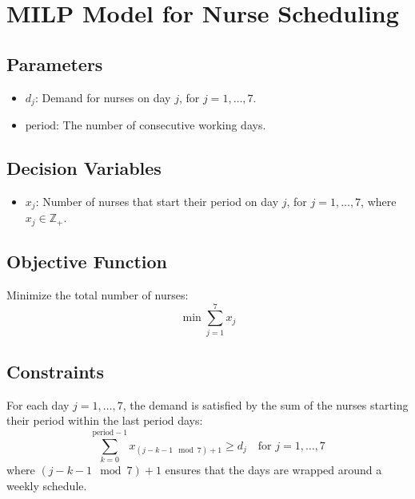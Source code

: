\documentclass{article}
\begin{document}
\section*{MILP Model for Nurse Scheduling}

\subsection*{Parameters}
\begin{itemize}
    \item $d_j$: Demand for nurses on day $j$, for $j = 1, \ldots, 7$.
    \item $\text{period}$: The number of consecutive working days.
\end{itemize}

\subsection*{Decision Variables}
\begin{itemize}
    \item $x_j$: Number of nurses that start their period on day $j$, for $j = 1, \ldots, 7$, where $x_j \in \mathbb{Z}_+$.
\end{itemize}

\subsection*{Objective Function}
Minimize the total number of nurses:
\[
\min \sum_{j=1}^{7} x_j
\]

\subsection*{Constraints}
For each day $j = 1, \ldots, 7$, the demand is satisfied by the sum of the nurses starting their period within the last $\text{period}$ days:
\[
\sum_{k=0}^{\text{period}-1} x_{(j-k-1 \mod 7) + 1} \geq d_j \quad \text{for } j = 1, \ldots, 7
\]
where $(j-k-1 \mod 7) + 1$ ensures that the days are wrapped around a weekly schedule.
\end{document}
